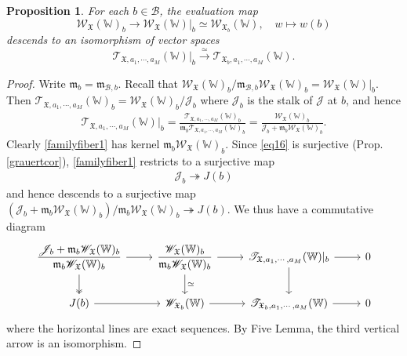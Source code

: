 \documentclass[11pt,b5paper,notitlepage]{article}
\theoremstyle{definition}
\theoremstyle{plain}
\newtheorem{pp}[df]{Proposition}
\newcommand{\fk}{\mathfrak}
\newcommand{\mc}{\mathcal}
\newcommand{\scr}{\mathscr}
\newcommand{\Wbb}{\mathbb W}
\newcommand{\<}{\left\langle}
\renewcommand{\>}{\right\rangle}
\newcommand{\MB}{\mathcal{B}}
\newcommand{\fx}{\mathfrak{X}}
\newcommand{\ST}{\mathscr{T}}
\newcommand{\SW}{\mathscr{W}}
\newcommand{\mk}{\mathfrak m}
\numberwithin{equation}{section}
\begin{document}
\begin{pp}
    For each $b\in \MB$, the evaluation map
    \begin{equation}\label{familyfiber1}
        \SW_\fx(\Wbb)_b\rightarrow \SW_{\fk X}(\Wbb)|_b\simeq\SW_{\fx_b}(\Wbb),\quad w\mapsto w(b)
    \end{equation}
    descends to an isomorphism of vector spaces
    $$
    \ST_{\fx,a_1,\cdots,a_M}(\Wbb)\vert_b \xrightarrow{\simeq} \ST_{\fx_b,a_1,\cdots,a_M}(\Wbb).
    $$
\end{pp}
\begin{proof}
Write $\mk_b=\mk_{\mc B,b}$. Recall that $\scr W_{\fk X}(\Wbb)_b/\fk m_{\mc B,b}\scr W_{\fk X}(\Wbb)_b=\scr W_{\fk X}(\Wbb)|_b$. Then $\ST_{\fx,a_1,\cdots,a_M}(\Wbb)_b=\scr W_{\fk X}(\Wbb)_b/\scr J_b$ where $\scr J_b$ is the stalk of $\scr J$ at $b$, and hence 
\begin{align*}
\ST_{\fx,a_1,\cdots,a_M}(\Wbb)|_b=\frac{\ST_{\fx,a_1,\cdots,a_M}(\Wbb)_b}{\mk_b\ST_{\fx,a_1,\cdots,a_M}(\Wbb)_b}=\frac{\scr W_{\fk X}(\Wbb)_b}{\scr J_b+\fk m_b\scr W_{\fk X}(\Wbb)_b}.
\end{align*}
Clearly \eqref{familyfiber1} has kernel $\mk_b\scr W_{\fk X}(\Wbb)_b$. Since \eqref{eq16} is surjective (Prop. \ref{grauertcor}),  \eqref{familyfiber1} restricts to a surjective map 
\begin{gather}
\scr J_b\twoheadrightarrow J(b)  \label{eq17}
\end{gather}
and hence descends to a surjective map $(\scr J_b+\mk_b\scr W_{\fk X}(\Wbb)_b)/\mk_b\scr W_{\fk X}(\Wbb)_b\twoheadrightarrow J(b)$. We thus have a commutative diagram
\begin{equation*}
\begin{tikzcd}
\displaystyle\frac{\scr J_b+\mk_b\scr W_{\fk X}(\Wbb)_b}{\mk_b\scr W_{\fk X}(\Wbb)_b} \arrow[d, two heads] \arrow[r] & \displaystyle \frac{\scr W_{\fk X}(\Wbb)_b}{\mk_b\scr W_{\fk X}(\Wbb)_b}  \arrow[r] \arrow[d,"\simeq"] & \ST_{\fx,a_1,\cdots,a_M}(\Wbb)|_b \arrow[r] \arrow[d] & 0 \\
J(b) \arrow[r]                      & \scr W_{\fk X_b}(\Wbb) \arrow[r]           & \ST_{\fx_b,a_1,\cdots,a_M}(\Wbb) \arrow[r]           & 0
\end{tikzcd}
\end{equation*}
where the horizontal lines are exact sequences. By Five Lemma, the third vertical arrow is an isomorphism.
\end{proof}
\end{document}
